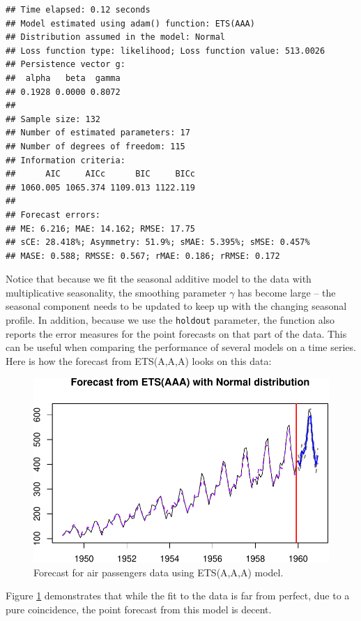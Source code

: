 \documentclass[
]{book}
\theoremstyle{definition}
\theoremstyle{definition}
\theoremstyle{definition}
\theoremstyle{definition}
\theoremstyle{remark}
\begin{document}
\begin{verbatim}
## Time elapsed: 0.12 seconds
## Model estimated using adam() function: ETS(AAA)
## Distribution assumed in the model: Normal
## Loss function type: likelihood; Loss function value: 513.0026
## Persistence vector g:
##  alpha   beta  gamma 
## 0.1928 0.0000 0.8072 
## 
## Sample size: 132
## Number of estimated parameters: 17
## Number of degrees of freedom: 115
## Information criteria:
##      AIC     AICc      BIC     BICc 
## 1060.005 1065.374 1109.013 1122.119 
## 
## Forecast errors:
## ME: 6.216; MAE: 14.162; RMSE: 17.75
## sCE: 28.418%; Asymmetry: 51.9%; sMAE: 5.395%; sMSE: 0.457%
## MASE: 0.588; RMSSE: 0.567; rMAE: 0.186; rRMSE: 0.172
\end{verbatim}

Notice that because we fit the seasonal additive model to the data with multiplicative seasonality, the smoothing parameter \(\gamma\) has become large -- the seasonal component needs to be updated to keep up with the changing seasonal profile. In addition, because we use the \texttt{holdout} parameter, the function also reports the error measures for the point forecasts on that part of the data. This can be useful when comparing the performance of several models on a time series. Here is how the forecast from ETS(A,A,A) looks on this data:

\begin{figure}
\centering
\includegraphics{Svetunkov--2022----ADAM_files/figure-latex/AirPassengersAAAForecast-1.pdf}
\caption{\label{fig:AirPassengersAAAForecast}Forecast for air passengers data using ETS(A,A,A) model.}
\end{figure}

Figure \ref{fig:AirPassengersAAAForecast} demonstrates that while the fit to the data is far from perfect, due to a pure coincidence, the point forecast from this model is decent.
\end{document}
